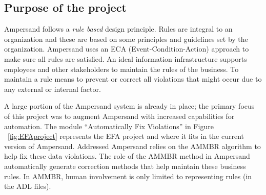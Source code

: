 %

\subsection{Purpose of the project}

Ampersand follows a \emph{rule based} design principle. Rules are integral to an organization
and these are based on some principles and guidelines set by the organization.
Ampersand uses an ECA (Event-Condition-Action) approach to make sure all rules are satisfied. An ideal information infrastructure supports employees and other stakeholders to maintain the rules of the business. To maintain a rule means to prevent or correct all violations that might occur due to any external or internal factor.
 
 A large portion of the Ampersand system is already in place; the primary focus of this project was to
augment Ampersand with increased capabilities for automation. The module ``Automatically Fix Violations'' in Figure ~\ref{fig:EFAproject} represents the EFA project and where it fits in the current version of Ampersand.
  {Addressed}
Ampersand relies on the AMMBR \citep{Ampersand} algorithm to help fix these data violations.
The role 
of the AMMBR method in Ampersand  automatically generate correction methods that 
help maintain these business rules. In AMMBR, human involvement is only limited 
to representing rules (in the ADL files).

